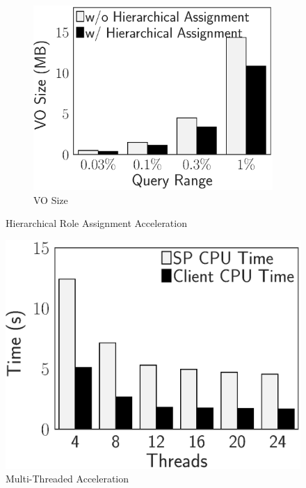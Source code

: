 \begin{figure}[t]
\begin{subfigure}{.33\linewidth}
        \includegraphics[height=\ht\figbox]{exp-figs/access-control/hierarchical_vo.eps}
        \caption{VO Size}
    \end{subfigure}
    \caption{Hierarchical Role Assignment Acceleration}\label{exp-fig:access-control:hierarchical}
\end{figure}
\begin{figure}[t]
    \centering
    \includegraphics[height=\ht\figbox]{exp-figs/access-control/thread.eps}
    \caption{Multi-Threaded Acceleration}\label{exp-fig:access-control:thread}
\end{figure}
